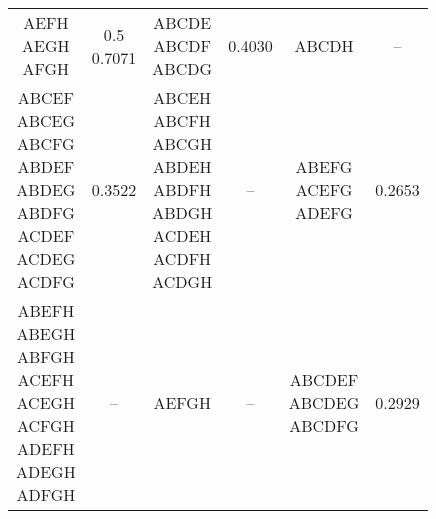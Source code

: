 \documentclass{article}
\begin{document}
\begin{center}
\begin{tabular*}{0.9\textwidth}{@{\extracolsep{\fill}}cccccc}
\cline{1-2} \cline{3-4} \cline{5-6}
\makecell{AEFH\\AEGH\\AFGH} & \makecell{0.5\\0.7071} & \makecell{ABCDE\\ABCDF\\ABCDG} & 0.4030 & ABCDH & -- \\
\cline{1-2} \cline{3-4} \cline{5-6}
\makecell{ABCEF\\ABCEG\\ABCFG\\ABDEF\\ABDEG\\ABDFG\\ACDEF\\ACDEG\\ACDFG} & 0.3522 & \makecell{ABCEH\\ABCFH\\ABCGH\\ABDEH\\ABDFH\\ABDGH\\ACDEH\\ACDFH\\ACDGH} & -- & \makecell{ABEFG\\ACEFG\\ADEFG} & 0.2653 \\
\cline{1-2} \cline{3-4} \cline{5-6}
\makecell{ABEFH\\ABEGH\\ABFGH\\ACEFH\\ACEGH\\ACFGH\\ADEFH\\ADEGH\\ADFGH} & -- & AEFGH & -- & \makecell{ABCDEF\\ABCDEG\\ABCDFG} & 0.2929 \\
\cline{1-2} \cline{3-4} \cline{5-6}
\end{tabular*}
\end{center}
\end{document}
